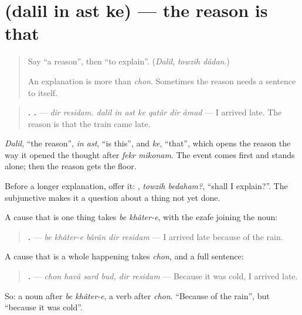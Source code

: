 \section[\texorpdfstring{\fa{دلیل} \fa{این} \fa{است} \fa{که} (dalil in ast ke)}{دلیل این است که (dalil in ast ke)}]{    (dalil in ast ke) — the reason is that}

\label{lesson:FA-C293-dalil-in-ast}



\begin{quote}
Say \textquotedblleft{}a reason\textquotedblright{}, then \textquotedblleft{}to explain\textquotedblright{}. (\emph{Dalil}, \emph{towzih dâdan}.)

An explanation is more than \emph{chon}. Sometimes the reason needs a sentence to itself.
\end{quote}

\begin{grammarlens}[title={Grammar Lens: the reason, in a sentence of its own}]
\begin{quote}
\textbf{ .       .} — \emph{dir residam. dalil in ast ke qatâr dir âmad} — I arrived late. The reason is that the train came late.
\end{quote}

\emph{Dalil}, \textquotedblleft{}the reason\textquotedblright{}, \emph{in ast}, \textquotedblleft{}is this\textquotedblright{}, and \emph{ke}, \textquotedblleft{}that\textquotedblright{}, which opens the reason the way it opened the thought after \emph{fekr mikonam}. The event comes first and stands alone; then the reason gets the floor.

Before a longer explanation, offer it: \textbf{ }, \emph{towzih bedaham?}, \textquotedblleft{}shall I explain?\textquotedblright{}. The subjunctive makes it a question about a thing not yet done.
\end{grammarlens}

\begin{grammarlens}[title={Grammar Lens: a noun, or a sentence}]
A cause that is one thing takes \emph{be khâter-e}, with the ezafe joining the noun:

\begin{quote}
\textbf{    .} — \emph{be khâter-e bârân dir residam} — I arrived late because of the rain.
\end{quote}

A cause that is a whole happening takes \emph{chon}, and a full sentence:

\begin{quote}
\textbf{     .} — \emph{chon havâ sard bud, dir residam} — Because it was cold, I arrived late.
\end{quote}

So: a noun after \emph{be khâter-e}, a verb after \emph{chon}. \textquotedblleft{}Because of the rain\textquotedblright{}, but \textquotedblleft{}because it was cold\textquotedblright{}.
\end{grammarlens}

